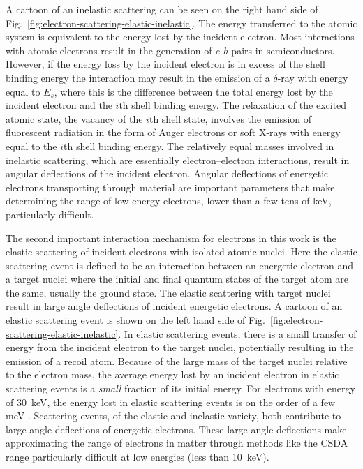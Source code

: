 A cartoon of an inelastic scattering can be seen on the right hand side of Fig.~\ref{fig:electron-scattering-elastic-inelastic}. 
The energy transferred to the atomic system is equivalent to the energy lost by the incident electron.
Most interactions with atomic electrons result in the generation of \emph{e-h} pairs in semiconductors.
However, if the energy loss by the incident electron is in excess of the shell binding energy the interaction may result in the emission of a $\delta$-ray with energy equal to $E_s$, where this is the difference between the total energy lost by the incident electron and the $i$th shell binding energy.
The relaxation of the excited atomic state, the vacancy of the $i$th shell state, involves the emission of fluorescent radiation in the form of Auger electrons or soft X-rays with energy equal to the $i$th shell binding energy.
The relatively equal masses involved in inelastic scattering, which are essentially electron--electron interactions, result in angular deflections of the incident electron.
Angular deflections of energetic electrons transporting through material are important parameters that make determining the range of low energy electrons, lower than a few tens of keV, particularly difficult.

The second important interaction mechanism for electrons in this work is the elastic scattering of incident electrons with isolated atomic nuclei.
Here the elastic scattering event is defined to be an interaction between an energetic electron and a target nuclei where the initial and final quantum states of the target atom are the same, usually the ground state.
The elastic scattering with target nuclei result in large angle deflections of incident energetic electrons.
A cartoon of an elastic scattering event is shown on the left hand side of Fig.~\ref{fig:electron-scattering-elastic-inelastic}.
In elastic scattering events, there is a small transfer of energy from the incident electron to the target nuclei, potentially resulting in the emission of a recoil atom.
Because of the large mass of the target nuclei relative to the electron mass, the average energy lost by an incident electron in elastic scattering events is a \emph{small} fraction of its initial energy.
For electrons with energy of 30~keV, the energy lost in elastic scattering events is on the order of a few meV \cite{Salvat:ue}.
Scattering events, of the elastic and inelastic variety, both contribute to large angle deflections of energetic electrons.
These large angle deflections make approximating the range of electrons in matter through methods like the CSDA range particularly difficult at low energies (less than 10~keV).

